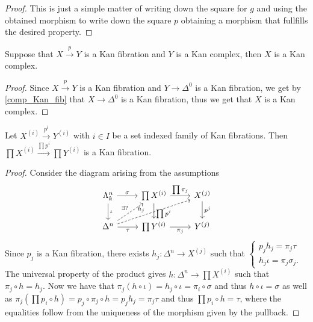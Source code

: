 \begin{proof}
    This is just a simple matter of writing down the square for $g$ and using the obtained morphism to write down the square $p$ obtaining a morphism that fullfills the desired property.
\end{proof}

\begin{cor}
    Suppose that $X \xrightarrow{p} Y$ is a Kan fibration and $Y$ is a Kan complex, then $X$ is a Kan complex.
\end{cor}

\begin{proof}
    Since $X \xrightarrow{p} Y$ is a Kan fibration and $Y \to \Delta^0$ is a Kan fibration, we get by \cref{comp_Kan_fib} that $X \to \Delta^0$ is a Kan fibration, thus we get that $X$ is a Kan complex.
\end{proof}

\begin{prop}
    Let $X^{(i)} \xrightarrow{p^i} Y^{(i)}$ with $i \in I$ be a set indexed family of Kan fibrations.
    Then $\prod X^{(i)} \xrightarrow{\prod p^i} \prod Y^{(i)}$ is a Kan fibration.
\end{prop}

\begin{proof}
Consider the diagram arising from the assumptions
\[
    \begin{tikzcd}
        \Lambda_k^n
        \ar[r,"\sigma"]
        \ar[d,"\iota"]
        &
        \prod X^{(i)}
        \ar[d, "\prod p^i" pos=0.7]
        \ar[r, "\prod \pi_j"]
        &
        X^{(j)}
        \ar[d, "p^j"]
        \\
        \Delta^n
        \ar[ru, dashed, "\exists ?"]
        \ar[rru, dashed, "h_j" pos=0.4]
        \ar[r, "\tau"']
        &
        \prod Y^{(i)}
        \ar[r, "\pi_j"']
        &
        Y^{(j)}
    \end{tikzcd}
\]
Since $p_j$ is a Kan fibration, there exists $h_j \colon \Delta^n \to X^{(j)}$ such that 
$\begin{cases}
    p_jh_j=\pi_j\tau\\
    h_j\iota = \pi_j \sigma_j.
\end{cases}$
    The universal property of the product gives $h \colon \Delta^n \to \prod X^{(i)}$ such that $\pi_j \circ h = h_j$.
    Now we have that $\pi_j(h \circ \iota ) = h_j \circ \iota = \pi_i \circ \sigma$ and thus $h \circ \iota = \sigma$ as well as $\pi_j(\prod {p_i} \circ h) = p_j \circ \pi_j \circ h = p_j h_j = \pi_j \tau$ and thus $\prod p_i \circ h = \tau$, where the equalities follow from the uniqueness of the morphism given by the pullback.
\end{proof}

